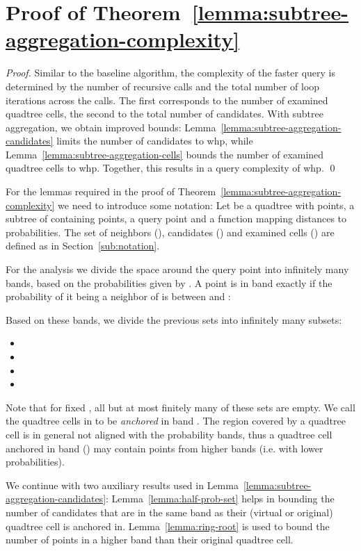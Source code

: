 \documentclass{llncs}
\begin{document}
\section{Proof of Theorem~\ref{lemma:subtree-aggregation-complexity}}
\label{sec:proof-subtree-aggregation-complexitx}
\begin{proof}
Similar to the baseline algorithm, the complexity of the faster query is determined by the number of recursive calls and the total number of loop iterations across the calls.
The first corresponds to the number of examined quadtree cells, the second to the total number of candidates.
With subtree aggregation, we obtain improved bounds: Lemma~\ref{lemma:subtree-aggregation-candidates} limits the number of candidates to  whp, while Lemma~\ref{lemma:subtree-aggregation-cells} bounds the number of examined quadtree cells to  whp.
Together, this results in a query complexity of  whp.
\qed
\end{proof}

\label{subsubsec:subtree-complexity-notation}
For the lemmas required in the proof of Theorem~\ref{lemma:subtree-aggregation-complexity} we need to introduce some
notation:
Let  be a quadtree with  points,  a subtree of  containing  points,  a query point and  a function mapping distances to probabilities.
The set of neighbors (), candidates () and examined cells () are defined as in Section~\ref{sub:notation}.

For the analysis we divide the space around the query point  into infinitely many bands, based on the probabilities given by .
A point  is in band  exactly if the probability of it being a neighbor of  is between  and :

Based on these bands, we divide the previous sets into infinitely many subsets:
\begin{itemize}
 \item 
 \item 
 \item 
 \item 
\end{itemize}

Note that for fixed , all but at most finitely many of these sets are empty.
We call the quadtree cells in  to be \emph{anchored} in band .
The region covered by a quadtree cell is in general not aligned with the probability bands, thus a quadtree cell anchored in band  () may contain points from higher bands (i.e. with lower probabilities).

We continue with two auxiliary results used in Lemma~\ref{lemma:subtree-aggregation-candidates}:
Lemma~\ref{lemma:half-prob-set} helps in bounding the number of candidates that are in the same band as their (virtual or original) quadtree cell is anchored in.
Lemma~\ref{lemma:ring-root} is used to bound the number of points in a higher band than their original quadtree cell.
\end{document}
